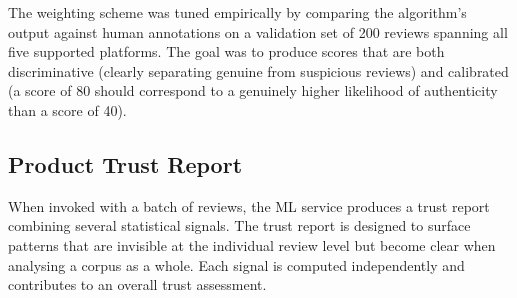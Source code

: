 \documentclass[12pt,a4paper,oneside]{report}
\begin{document}
The weighting scheme was tuned empirically by comparing the algorithm's
output against human annotations on a validation set of 200 reviews
spanning all five supported platforms. The goal was to produce scores
that are both discriminative (clearly separating genuine from suspicious
reviews) and calibrated (a score of 80 should correspond to a genuinely
higher likelihood of authenticity than a score of 40).

\subsection{Product Trust Report}
When invoked with a batch of reviews, the ML service produces a trust
report combining several statistical signals. The trust report is
designed to surface patterns that are invisible at the individual review
level but become clear when analysing a corpus as a whole. Each signal
is computed independently and contributes to an overall trust assessment.
\end{document}
